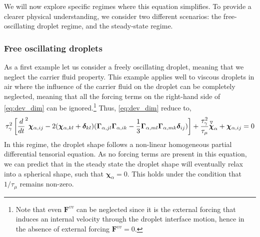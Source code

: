 We will now explore specific regimes where this equation simplifies. To provide a clearer physical understanding, we consider two different scenarios: 
the free-oscillating droplet regime,
and 
the steady-state regime. 


\subsubsection{Free oscillating droplets}

As a first example let us consider a freely oscillating droplet, meaning that we neglect the carrier fluid property. 
This example applies well to viscous droplets in air where the influence of the carrier fluid on the droplet can be completely neglected, meaning that all the forcing terms on the right-hand side of \ref{eq:dev_dim} can be ignored.\footnote{
    Note that even $\textbf{F}^{vv}$ can be neglected since it is the external forcing that induces an internal velocity through the droplet interface motion, hence in the absence of external forcing  $\textbf{F}^{vv}=0$.  
} 
Thus, \ref{eq:dev_dim} reduce to, 
\begin{equation}
    \tau_\gamma^2
    \left[
        \frac{d}{dt}^2 \bm\chi_{\alpha,ij}
        -  2 (\bm\chi_{\alpha,kl} + \bm\delta_{kl})
        (\bm\Gamma_{\alpha,jl}\bm\Gamma_{\alpha,ik}  
        - \frac{1}{3}
        \bm\Gamma_{\alpha,ml}\bm\Gamma_{\alpha,mk}  
        \bm\delta_{ij}
        )
    \right]
    + \frac{\tau_\gamma^2}{\tau_\mu} \overset{ \triangledown  }{\bm\chi}_\alpha
    + \bm\chi_{\alpha,ij} = 0
\end{equation}
In this regime, the droplet shape follows a non-linear homogeneous partial differential tensorial equation. 
As no forcing terms are present in this equation, we can predict that in the steady state the droplet shape will eventually relax into a spherical shape, such that $\bm\chi_\alpha = 0$.
This holds under the condition that $1/\tau_\mu$ remains non-zero.   


